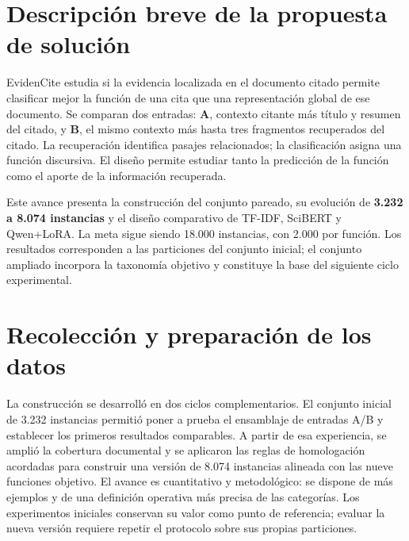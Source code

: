 \documentclass[10pt,a4paper,twocolumn]{article}
\begin{document}
\raggedbottom
{}

\section{Descripción breve de la propuesta de solución}
EvidenCite estudia si la evidencia localizada en el documento citado permite clasificar mejor la función de una cita que una representación global de ese documento. Se comparan dos entradas: \textbf{A}, contexto citante más título y resumen del citado, y \textbf{B}, el mismo contexto más hasta tres fragmentos recuperados del citado. La recuperación identifica pasajes relacionados; la clasificación asigna una función discursiva. El diseño permite estudiar tanto la predicción de la función como el aporte de la información recuperada.

Este avance presenta la construcción del conjunto pareado, su evolución de \textbf{3.232 a 8.074 instancias} y el diseño comparativo de TF-IDF, SciBERT y Qwen+LoRA. La meta sigue siendo 18.000 instancias, con 2.000 por función. Los resultados corresponden a las particiones del conjunto inicial; el conjunto ampliado incorpora la taxonomía objetivo y constituye la base del siguiente ciclo experimental.

\section{Recolección y preparación de los datos}
La construcción se desarrolló en dos ciclos complementarios. El conjunto inicial de 3.232 instancias permitió poner a prueba el ensamblaje de entradas A/B y establecer los primeros resultados comparables. A partir de esa experiencia, se amplió la cobertura documental y se aplicaron las reglas de homologación acordadas para construir una versión de 8.074 instancias alineada con las nueve funciones objetivo. El avance es cuantitativo y metodológico: se dispone de más ejemplos y de una definición operativa más precisa de las categorías. Los experimentos iniciales conservan su valor como punto de referencia; evaluar la nueva versión requiere repetir el protocolo sobre sus propias particiones.
\end{document}
